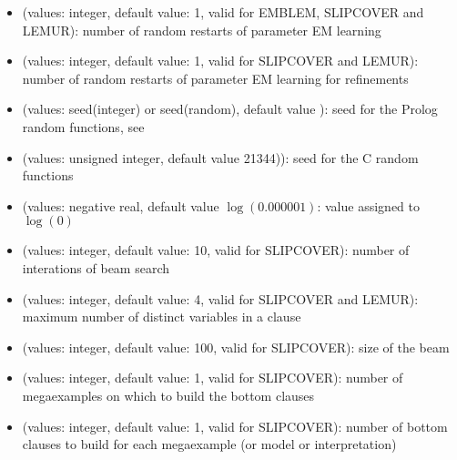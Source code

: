 \documentclass[letterpaper,10pt,english]{sphinxmanual}
\begin{document}
\begin{itemize}
\item {} 
\sphinxAtStartPar
{} (values: integer, default value: 1, valid for EMBLEM, SLIPCOVER and LEMUR): number of random restarts of parameter EM learning

\item {} 
\sphinxAtStartPar
{} (values: integer, default value: 1, valid for SLIPCOVER and LEMUR): number of random restarts of parameter EM learning for refinements

\item {} 
\sphinxAtStartPar
{} (values: seed(integer) or seed(random), default value ): seed for the Prolog random functions, see 

\item {} 
\sphinxAtStartPar
{} (values: unsigned integer, default value 21344)): seed for the C random functions

\item {} 
\sphinxAtStartPar
{} (values: negative real, default value \(\log(0.000001)\): value assigned to \(\log(0)\)

\item {} 
\sphinxAtStartPar
{} (values: integer, default value: 10, valid for SLIPCOVER): number of interations of beam search

\item {} 
\sphinxAtStartPar
{} (values: integer, default value: 4, valid for SLIPCOVER and LEMUR): maximum number of distinct variables in a clause

\item {} 
\sphinxAtStartPar
{} (values: integer, default value: 100, valid for SLIPCOVER): size of the beam

\item {} 
\sphinxAtStartPar
{} (values: integer, default value: 1, valid for SLIPCOVER): number of mega\sphinxhyphen{}examples on which to build the bottom clauses

\item {} 
\sphinxAtStartPar
{} (values: integer, default value: 1, valid for SLIPCOVER): number of bottom clauses to build for each mega\sphinxhyphen{}example (or model or interpretation)


\end{itemize}
\end{document}
